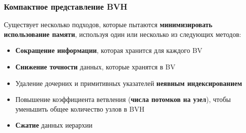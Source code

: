 \documentclass{beamer}
\begin{document}
\begin{frame}[t]
    \frametitle{Компактное представление BVH}
    Существует несколько подходов, которые пытаются \textbf{минимизировать использование памяти}, используя один или несколько из следующих методов:
    \begin{itemize}
        \item
            \textbf{Сокращение информации}, которая хранится для каждого BV
        \item
            \textbf{Снижение точности} данных, которые хранятся в BV
        \item
            Удаление дочерних и примитивных указателей \textbf{неявным индексированием}
        \item
            Повышение коэффициента ветвления (\textbf{числа потомков на узел}), чтобы уменьшить общее количество узлов в BVH
        \item
            \textbf{Сжатие} данных иерархии
    \end{itemize}

\end{frame}
\end{document}
